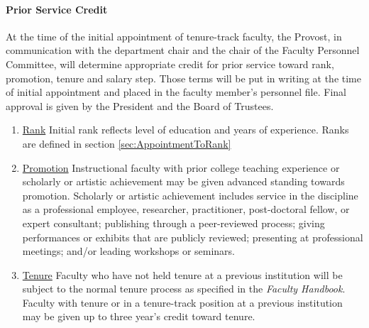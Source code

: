 			\paragraph{Prior Service Credit}
				\label{sec:PriorServiceCredit}
				At the time of the initial appointment of tenure-track faculty, the Provost, in communication with the department chair and the chair of the Faculty Personnel Committee, will determine appropriate credit for prior service toward rank, promotion, tenure and salary step.  Those terms will be put in writing at the time of initial appointment and placed in the faculty member's personnel file.  Final approval is given by the President and the Board of Trustees.
				\begin{enumerate}[label=\alph*)]

					\item{\underline{Rank} Initial rank reflects level of education and
						years of experience.  Ranks are defined in
						section
						\ref{sec:AppointmentToRank}
					}

					\item{\underline{Promotion} Instructional faculty with prior
						college teaching experience or scholarly or artistic
						achievement may be given advanced standing towards
						promotion.  Scholarly or artistic achievement includes
						service in the discipline as a professional employee,
						researcher, practitioner, post-doctoral fellow, or expert
						consultant; publishing through a peer-reviewed process;
						giving performances or exhibits that are publicly reviewed;
						presenting at professional meetings; and/or leading
						workshops or seminars.}

					\item{\underline{Tenure} Faculty who have not held tenure at
						a previous institution will be subject to the normal tenure
						process as specified in the \emph{Faculty Handbook}.
						Faculty with tenure or in a tenure-track position at a
						previous institution may be given up to three year's credit
						toward tenure.

}
\end{enumerate}
